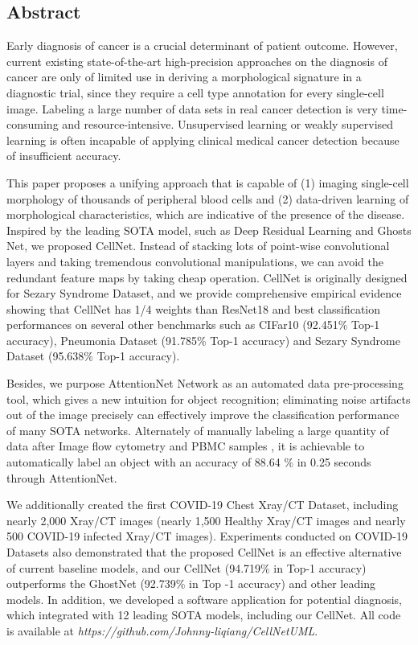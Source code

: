 {\subsection{Abstract}
\label{sec:abstract}
Early diagnosis of cancer is a crucial determinant of patient outcome. However, current existing state-of-the-art high-precision approaches on the diagnosis of cancer are only of limited use in deriving a morphological signature in a diagnostic trial, since they require a cell type annotation for every single-cell image. Labeling a large number of data sets in real cancer detection is very time-consuming and resource-intensive. Unsupervised learning or weakly supervised learning is often incapable of applying clinical medical cancer detection because of insufficient accuracy.

This paper proposes a unifying approach that is capable of (1) imaging single-cell morphology of thousands of peripheral blood cells and (2) data-driven learning of morphological characteristics, which are indicative of the presence of the disease.
Inspired by the leading SOTA model, such as Deep Residual Learning\cite{20} and Ghosts Net\cite{19}, we proposed CellNet. Instead of stacking lots of point-wise convolutional layers and taking tremendous convolutional manipulations, we can avoid the redundant feature maps by taking cheap operation. CellNet is originally designed for Sezary Syndrome Dataset, and we provide comprehensive empirical evidence showing that CellNet has 1/4 weights than ResNet18 \cite{20} and best classification performances on several other benchmarks such as CIFar10 \cite{21} (92.451\% Top-1 accuracy), Pneumonia Dataset\cite{38} (91.785\% Top-1 accuracy) and Sezary Syndrome Dataset (95.638\% Top-1 accuracy).

Besides, we purpose AttentionNet Network as an automated data pre-processing tool, which gives a new intuition for object recognition; eliminating noise artifacts out of the image precisely can effectively improve the classification performance of many SOTA networks. Alternately of manually labeling a large quantity of data after Image flow cytometry and PBMC samples \cite{12}, it is achievable to automatically label an object with an accuracy of 88.64 \% in 0.25 seconds through AttentionNet. 

We additionally created the first COVID-19 Chest Xray/CT Dataset, including nearly 2,000 Xray/CT images (nearly 1,500 Healthy Xray/CT images and nearly 500 COVID-19 infected Xray/CT images). Experiments conducted on COVID-19 Datasets also demonstrated that the proposed CellNet is an effective alternative of current baseline models, and our CellNet (94.719\% in Top-1 accuracy) outperforms the GhostNet\cite{19} (92.739\%  in Top -1 accuracy) and other leading models. In addition, we developed a software application for potential diagnosis, which integrated with 12 leading SOTA models, including our CellNet. All code is available at \textit{https://github.com/Johnny-liqiang/CellNetUML}.

}
